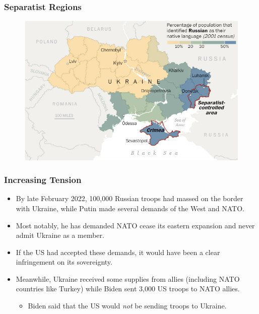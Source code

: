 \documentclass{beamer}
\begin{document}
\begin{frame} 
	\frametitle{\LARGE{Separatist Regions}}
	\begin{figure}[ht!]
		\centering
		\includegraphics[width=\textwidth,height=\textheight, keepaspectratio]{sep2.png}
	\end{figure}
\end{frame}

\begin{frame} 
	\frametitle{\LARGE{Increasing Tension}}
	\begin{itemize}
		\item By late February 2022, 100,000 Russian troops had massed on the border with Ukraine, while Putin made several demands of the West and NATO. \pause
		\item Most notably, he has demanded NATO cease its eastern expansion and never admit Ukraine as a member. \pause
		\item If the US had accepted these demands, it would have been a clear infringement on its sovereignty. \pause
		\item Meanwhile, Ukraine received some supplies from allies (including NATO countries like Turkey) while Biden sent 3,000 US troops to NATO allies.
		\begin{itemize}
			\item Biden said that the US would \textit{not} be sending troops to Ukraine.
		\end{itemize}
	\end{itemize}
\end{frame}
\end{document}
